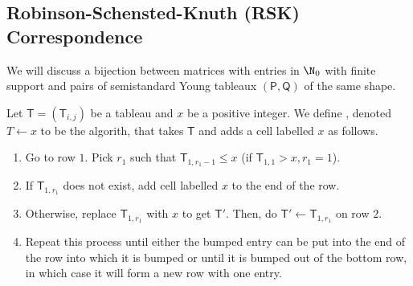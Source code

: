 \documentclass[11pt,leqno,oneside]{amsart}
\numberwithin{thm}{section}
\newcommand{\T}{\mathsf{T}} %
\newcommand{\TP}{\mathsf{P}}
\newcommand{\TQ}{\mathsf{Q}}
\begin{document}
\subsection{Robinson-Schensted-Knuth (RSK) Correspondence}
We will discuss a bijection between matrices with entries in \(\N_0\)
with finite support and pairs of semistandard Young tableaux \((\TP,
\TQ)\) of the same shape. 
\begin{defn}
  Let \(\T = (\T_{i,j})\) be a tableau and \(x\) be a positive
  integer. We define 
  , denoted \(T \leftarrow x\) to be the algorith,
  that takes \(\T\) and adds a cell labelled \(x\) as follows.
  \begin{enumerate}[label=(\arabic*)]
  \item Go to row \(1\). Pick \(r_1\) such that \(\T_{1,r_1-1} \leq x\)
    (if \(\T_{1,1} > x, r_1=1\)).
  \item If \(\T_{1,r_1}\) does not exist, add
    cell labelled \(x\) to the end of the row.
  \item Otherwise, replace \(\T_{1,r_1}\) with \(x\) to get
    \(\T'\). Then, do \(\T' \leftarrow \T_{1,r_1}\) on row \(2\).
  \item Repeat this process until either the bumped entry can be put
    into the end of the row into which it is bumped or until it is
    bumped out of the bottom row, in which case it will form a new row
    with one entry. 
  \end{enumerate}
\end{defn}
\end{document}

